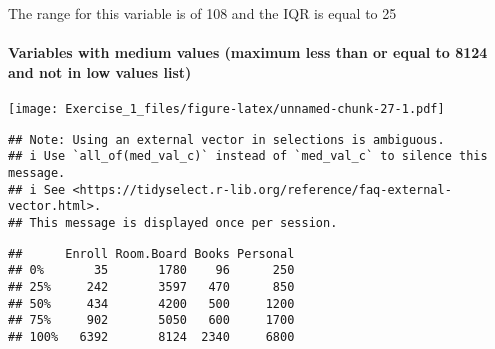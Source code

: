 \documentclass[]{article}
\newenvironment{Shaded}{\begin{snugshade}}{\end{snugshade}}
\newcommand{\CommentTok}[1]{\textcolor[rgb]{0.56,0.35,0.01}{\textit{#1}}}
\newcommand{\DataTypeTok}[1]{\textcolor[rgb]{0.13,0.29,0.53}{#1}}
\newcommand{\KeywordTok}[1]{\textcolor[rgb]{0.13,0.29,0.53}{\textbf{#1}}}
\newcommand{\NormalTok}[1]{#1}
\newcommand{\OperatorTok}[1]{\textcolor[rgb]{0.81,0.36,0.00}{\textbf{#1}}}
\newcommand{\OtherTok}[1]{\textcolor[rgb]{0.56,0.35,0.01}{#1}}
\newcommand{\StringTok}[1]{\textcolor[rgb]{0.31,0.60,0.02}{#1}}
\let\oldparagraph\paragraph
\renewcommand{\paragraph}[1]{\oldparagraph{#1}\mbox{}}
\begin{document}
The range for this variable is of 108 and the IQR is equal to 25

\hypertarget{variables-with-medium-values-maximum-less-than-or-equal-to-8124-and-not-in-low-values-list}{%
\paragraph{Variables with medium values (maximum less than or equal to
8124 and not in low values
list)}\label{variables-with-medium-values-maximum-less-than-or-equal-to-8124-and-not-in-low-values-list}}

\begin{Shaded}
\end{Shaded}

\texttt{[image: Exercise\_1\_files/figure-latex/unnamed-chunk-27-1.pdf]}

\begin{Shaded}
\end{Shaded}

\begin{verbatim}
## Note: Using an external vector in selections is ambiguous.
## i Use `all_of(med_val_c)` instead of `med_val_c` to silence this message.
## i See <https://tidyselect.r-lib.org/reference/faq-external-vector.html>.
## This message is displayed once per session.
\end{verbatim}

\begin{verbatim}
##      Enroll Room.Board Books Personal
## 0%       35       1780    96      250
## 25%     242       3597   470      850
## 50%     434       4200   500     1200
## 75%     902       5050   600     1700
## 100%   6392       8124  2340     6800
\end{verbatim}
\end{document}
